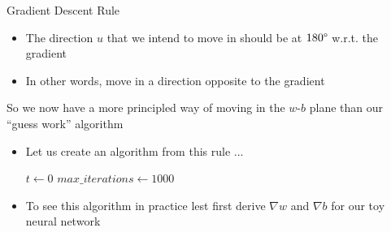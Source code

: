 \begin{frame}
	\begin{overlayarea}{\textwidth}{\textheight}
		\begin{block}{Gradient Descent Rule}
			\begin{itemize}\justifying
				\item<1-> The direction $u$ that we intend to move in should be at $180\degree$ w.r.t. the gradient
				\item<2-> In other words, move in a direction opposite to the gradient
			\end{itemize}
		\end{block}
		 {So we now have a more principled way of moving in the $w$-$b$ plane than our ``guess work'' algorithm}
	\end{overlayarea}
\end{frame}

\begin{frame}
	\begin{overlayarea}{\textwidth}{\textheight}
		\begin{itemize}\justifying
			\item <1-> Let us create an algorithm from this rule ...
			      \only<2-> {
				      \begin{algorithm}[H]
					      \SetAlgoLined
					      $t \leftarrow 0$\;
					      $max\_iterations\leftarrow 1000$\;
					      \caption{gradient\_descent()}
				      \end{algorithm}
			      }
			\item <2-> To see this algorithm in practice lest first derive $\nabla w$ and $\nabla b$ for our toy neural network
		\end{itemize}
	\end{overlayarea}
\end{frame}

